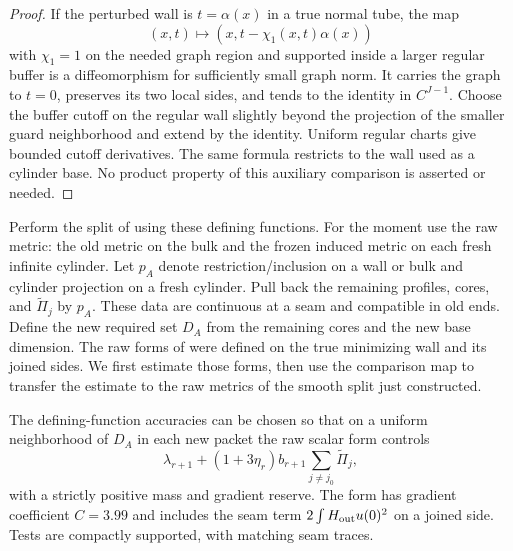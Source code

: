 \begin{proof}
If the perturbed wall is $t=\alpha(x)$ in a true normal tube, the map
\[
 (x,t)\longmapsto (x,t-\chi_1(x,t)\alpha(x))
\]
with $\chi_1=1$ on the needed graph region and supported inside a larger
regular buffer is a diffeomorphism for sufficiently small graph norm.
It carries the graph to $t=0$, preserves its two local sides, and tends
to the identity in $C^{J-1}$.  Choose the buffer cutoff on the regular
wall slightly beyond the projection of the smaller guard neighborhood
and extend by the identity.  Uniform regular charts give bounded
cutoff derivatives.  The same formula restricts to the wall used as a
cylinder base.  No product property of this auxiliary comparison is
asserted or needed.
\end{proof}

Perform the split of  using these defining functions.
For the moment use the raw metric: the old metric on the bulk and the
frozen induced metric on each fresh infinite cylinder.  Let $p_A$ denote
restriction/inclusion on a wall or bulk and cylinder projection on a
fresh cylinder.  Pull back the remaining profiles, cores, and
$\widetilde\Pi_j$ by $p_A$.  These data are continuous at a seam and
compatible in old ends.  Define the new required set $D_A$ from the
remaining cores and the new base dimension.
The raw forms of  were defined on the true
minimizing wall and its joined sides.  We first estimate those forms,
then use the comparison map to transfer the estimate to the raw metrics
of the smooth split just constructed.

\begin{lemma}\label{regular:transfer}
The defining-function accuracies can be chosen so that on a uniform
neighborhood of $D_A$ in each new packet the raw scalar form controls
\begin{equation}\label{regular:raw-target}
 \lambda_{r+1}+(1+3\eta_r)b_{r+1}\sum_{j\ne j_0}\widetilde\Pi_j,
\end{equation}
with a strictly positive mass and gradient reserve.  The form has
gradient coefficient $C=3.99$ and includes the seam term
$2\int H_{\rm out}u(0)^2$ on a joined side.  Tests are compactly
supported, with matching seam traces.
\end{lemma}

